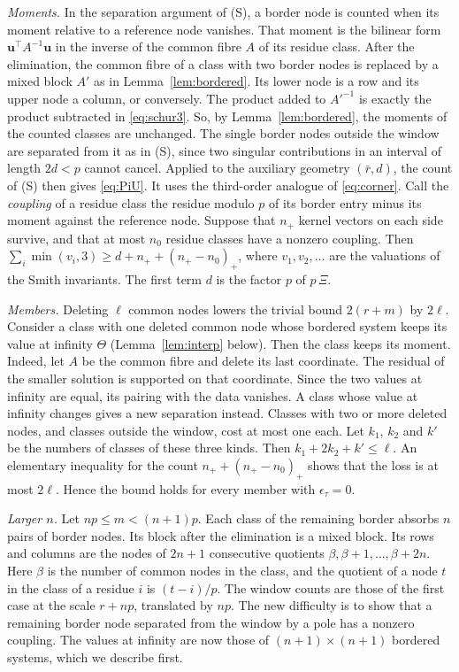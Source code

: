 \documentclass[11pt]{amsart}
\theoremstyle{definition}
\theoremstyle{remark}
\numberwithin{equation}{section}
\begin{document}
\emph{Moments.} In the separation argument of (S), a border node is counted when its moment relative to a reference
node vanishes. That moment is the bilinear form $\mathbf u^\top A^{-1}\mathbf u$ in the inverse of the common fibre $A$
of its residue class. After the elimination, the common fibre of a class with two border nodes is replaced by a mixed
block $A'$ as in Lemma~\ref{lem:bordered}. Its lower node is a row and its upper node a column, or conversely. The
product added to $A'^{-1}$ is exactly the product subtracted in \eqref{eq:schur3}. So, by Lemma~\ref{lem:bordered}, the
moments of the counted classes are unchanged. The single border nodes outside the window are separated from it as in
(S), since two singular contributions in an interval of length $2d<p$ cannot cancel. Applied to the auxiliary geometry
$(\bar r,d)$, the count of (S) then gives \eqref{eq:PiU}. It uses the third-order analogue of \eqref{eq:corner}. Call
the \emph{coupling} of a residue class the residue modulo $p$ of its border entry minus its moment against the reference
node. Suppose that $n_+$ kernel vectors on each side survive, and that at most $n_0$ residue classes have a nonzero
coupling. Then
$\sum_i\min(v_i,3)\ge d+n_++(n_+-n_0)_+$, where $v_1,v_2,\dots$ are the valuations of the
Smith invariants. The first term $d$ is the factor $p$ of $p\,\Xi$.

\emph{Members.} Deleting $\ell$ common nodes lowers the trivial bound $2(r+m)$ by $2\ell$. Consider a class with one
deleted common node whose bordered system keeps its value at infinity $\Theta$ (Lemma~\ref{lem:interp} below). Then
the class keeps its moment. Indeed, let $A$ be the common fibre and delete its last coordinate. The residual of the
smaller solution is supported on that coordinate. Since the two values at infinity are equal, its pairing with the data
vanishes. A class whose value at infinity changes gives a new separation instead. Classes with
two or more deleted nodes, and classes outside the window, cost at most one each. Let $k_1$, $k_2$ and $k'$ be the
numbers of classes of these three kinds. Then $k_1+2k_2+k'\le\ell$. An elementary inequality for the count
$n_++(n_+-n_0)_+$ shows that the loss is at most $2\ell$. Hence the bound holds for every
member with $\epsilon_\tau=0$.

\emph{Larger $n$.} Let $np\le m<(n+1)p$. Each class of the remaining border absorbs $n$ pairs of border nodes. Its block
after the elimination is a mixed block. Its rows and columns are the nodes of $2n+1$ consecutive quotients
$\beta,\beta+1,\dots,\beta+2n$. Here $\beta$ is the number of common nodes in the class, and the quotient of a node $t$ in
the class of a residue $i$ is $(t-i)/p$. The window counts are those of the first case at the scale $r+np$, translated by
$np$. The new difficulty is to show that a remaining border node separated from the window by a pole has a nonzero
coupling. The values at infinity are now those of $(n+1)\times(n+1)$ bordered systems, which we describe first.
\end{document}
